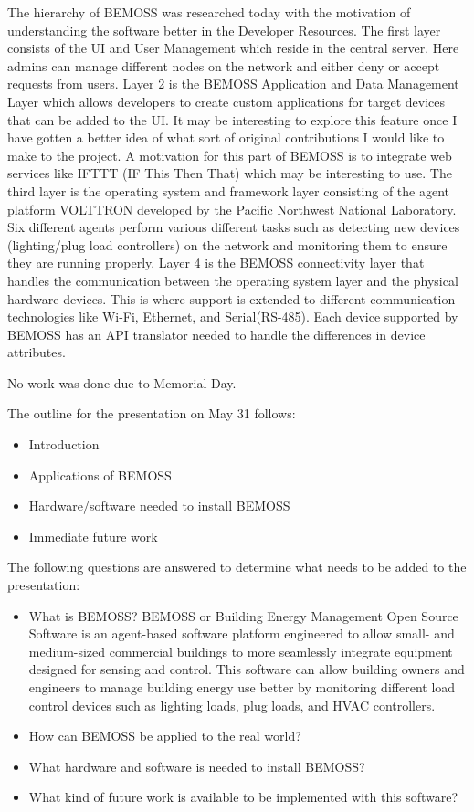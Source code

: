 \documentclass[fontsize=11pt, %
                             paper=letter, %
                             twoside, %
                             captions=tableheading,
                             index=totoc,
                             hyperref]{labbook}
\begin{document}
\begin{addmargin}[0cm]{0cm}
The hierarchy of BEMOSS was researched today with the motivation of understanding
the software better in the Developer Resources. The first layer consists of the UI and User
Management which reside in the central server. Here admins can manage different nodes
on the network and either deny or accept requests from users. Layer 2 is the BEMOSS
Application and Data Management Layer which allows developers to create custom
applications for target devices that can be added to the UI. It may be interesting to explore
this feature once I have gotten a better idea of what sort of original contributions I would
like to make to the project. A motivation for this part of BEMOSS is to integrate web
services like IFTTT (IF This Then That) which may be interesting to use. The third layer is
the operating system and framework layer consisting of the agent platform VOLTTRON
developed by the Pacific Northwest National Laboratory. Six different agents perform
various different tasks such as detecting new devices (lighting/plug load controllers)
on the network and monitoring them to ensure they are running properly. Layer 4 is
the BEMOSS connectivity layer that handles the communication between the operating
system layer and the physical hardware devices. This is where support is extended
to different communication technologies like Wi-Fi, Ethernet, and Serial(RS-485). Each
device supported by BEMOSS has an API translator needed to handle the differences in
device attributes.

No work was done due to Memorial Day.

The outline for the presentation on May 31 follows:
\begin{itemize}
\item Introduction
\item Applications of BEMOSS
\item Hardware/software needed to install BEMOSS
\item Immediate future work
\end{itemize}

The following questions are answered to determine what needs to be added to the
presentation:

\begin{itemize}
\item What is BEMOSS? BEMOSS or Building Energy Management Open Source Software
is an agent-based software platform engineered to allow small- and medium-sized
commercial buildings to more seamlessly integrate equipment designed for sensing
and control. This software can allow building owners and engineers to manage
building energy use better by monitoring different load control devices such as
lighting loads, plug loads, and HVAC controllers.
\item How can BEMOSS be applied to the real world?
\item What hardware and software is needed to install BEMOSS?
\item What kind of future work is available to be implemented with this software?
\end{itemize}


\end{addmargin}
\end{document}
